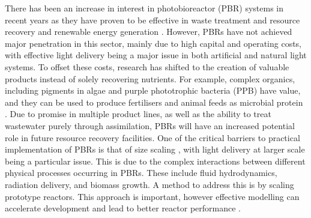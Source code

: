 There has been an increase in interest in photobioreactor (PBR) systems in recent years as they have proven to be effective in waste treatment and resource recovery \cite{hulsen2016a, hulsen2016} and renewable energy generation \cite{adessi2014}. However, PBRs have not achieved major penetration in this sector, mainly due to high capital and operating costs, with effective light delivery being a major issue in both artificial and natural light systems. To offset these costs, research has shifted to the creation of valuable products instead of solely recovering nutrients. For example, complex organics, including pigments in algae \cite{borowitzka2013} and purple phototrophic bacteria (PPB) have value, and they can be used to produce fertilisers and animal feeds as microbial protein \cite{matassa2016, matassa2015}. Due to promise in multiple product lines, as well as the ability to treat wastewater purely through assimilation, PBRs will have an increased potential role in future resource recovery facilities.
\skippingparagraph
One of the critical barriers to practical implementation of PBRs is that of size scaling \cite{acienFernandez1999}, with light delivery at larger scale being a particular issue. This is due to the complex interactions between different physical processes occurring in PBRs. These include fluid hydrodynamics, radiation delivery, and biomass growth. A method to address this is by scaling prototype reactors. This approach is important, however effective modelling can accelerate development and lead to better reactor performance \cite{perez-Castro2016}. 
\skippingparagraph
